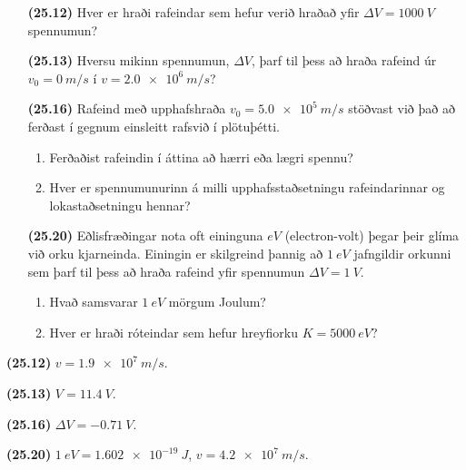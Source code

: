 \ifdefined \wholebook \else\documentclass[oneside]{book}\usepackage{EdlBook}\graphicspath{{figures/}}
\begin{document}
\begin{enumerate}[label = \textbf{(\alph*)}]

\item[\textbf{(25.12)}] Hver er hraði rafeindar sem hefur verið hraðað yfir $\Delta V = \SI{1000}{V}$ spennumun?

\item[\textbf{(25.13)}] Hversu mikinn spennumun, $\Delta V$, þarf til þess að hraða rafeind úr $v_0 = \SI{0}{m/s}$ í $v = \SI{2.0e6}{m/s}$?

\item[\textbf{(25.16)}] Rafeind með upphafshraða $v_0 = \SI{5.0e5}{m/s}$ stöðvast við það að ferðast í gegnum einsleitt rafsvið í plötuþétti.
\begin{enumerate}[label = \textbf{(\alph*})]
    \item Ferðaðist rafeindin í áttina að hærri eða lægri spennu?
    \item Hver er spennumunurinn á milli upphafsstaðsetningu rafeindarinnar og lokastaðsetningu hennar?
\end{enumerate}

\item[\textbf{(25.20)}] Eðlisfræðingar nota oft eininguna $\si{eV}$ (electron-volt) þegar þeir glíma við orku kjarneinda. Einingin er skilgreind þannig að $\SI{1}{eV}$ jafngildir orkunni sem þarf til þess að hraða rafeind yfir spennumun $\Delta V = \SI{1}{V}$.
\begin{enumerate}[label = \textbf{(\alph*)}]
    \item Hvað samsvarar $\SI{1}{eV}$ mörgum Joulum?
    \item Hver er hraði róteindar sem hefur hreyfiorku $K = \SI{5000}{eV}$?
\end{enumerate}

\end{enumerate}

\begin{tcolorbox}
\begin{enumerate*}[label = \vspace{0.15cm} ]
  \item \textbf{(25.12)} $v = \SI{1.9e7}{m/s}$.
  \item \textbf{(25.13)} $V = \SI{11.4}{V}$.
  \item \textbf{(25.16)} $\Delta V = \SI{-0.71}{V}$.
  \item \textbf{(25.20)} $\SI{1}{eV} = \SI{1.602e-19}{J}$, $v = \SI{4.2e7}{m/s}$.
\end{enumerate*}
\end{tcolorbox}
\end{document}
